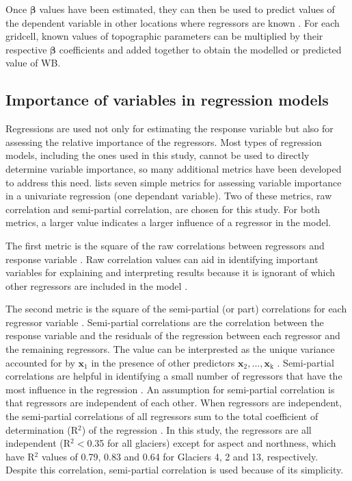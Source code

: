 \documentclass{sfuthesis}
\renewcommand{\vector}[1]{\mathbf{#1}}
\begin{document}
Once $\bm{\beta}$ values have been estimated, they can then be used to predict values of the dependent variable in other locations where regressors are known \citep{Davis1986}. For each gridcell, known values of topographic parameters can be multiplied by their respective $\bm{\beta}$ coefficients and added together to obtain the modelled or predicted value of WB.

\subsection{Importance of variables in regression models}

Regressions are used not only for estimating the response variable but also for assessing the relative importance of the regressors. Most types of regression models, including the ones used in this study, cannot be used to directly determine variable importance, so many additional metrics have been developed to address this need. \cite{Gromping2015} lists seven simple metrics for assessing variable importance in a univariate regression (one dependant variable). Two of these metrics, raw correlation and semi-partial correlation, are chosen for this study. For both metrics, a larger value indicates a larger influence of a regressor in the model.

The first metric is the square of the raw correlations between regressors and response variable \citep{Gromping2015}. Raw correlation values can aid in identifying important variables for explaining and interpreting results because it is ignorant of which other regressors are included in the model \citep{Darlington1968}. 

The second metric is the square of the semi-partial (or part) correlations for each regressor variable \citep{Gromping2015}. Semi-partial correlations are the correlation between the response variable and the residuals of the regression between each regressor and the remaining regressors. The value can be interprested as the unique variance accounted for by $\vector{x}_1$ in the presence of other predictors $\vector{x}_2,...,\vector{x}_\mathrm{k}$ \citep{Darlington1968, Bring1996}. Semi-partial correlations are helpful in identifying a small number of regressors that have the most influence in the regression \citep{Gromping2009}. An assumption for semi-partial correlation is that regressors are independent of each other. When regressors are independent, the semi-partial correlations of all regressors sum to the total coefficient of determination (R$^2$) of the regression  \citep{Gromping2015}. In this study, the regressors are all independent (R$^2<$0.35 for all glaciers) except for aspect and northness, which have R$^2$ values of 0.79, 0.83 and 0.64 for Glaciers 4, 2 and 13, respectively. Despite this correlation, semi-partial correlation is used because of its simplicity. 
\end{document}
